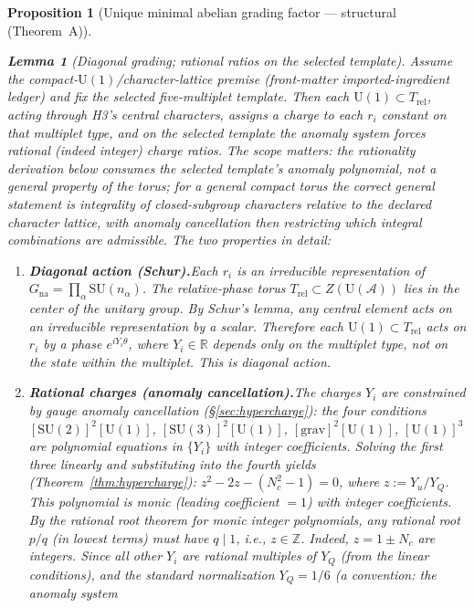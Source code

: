 \documentclass[11pt]{article}
\newtheorem{lemma}[theorem]{Lemma}
\newtheorem{proposition}[theorem]{Proposition}
\theoremstyle{definition}
\newcommand{\SU}{\mathrm{SU}}
\newcommand{\U}{\mathrm{U}}
\begin{document}
\begin{proposition}[Unique minimal abelian grading factor ---
structural (Theorem~A)]
\begin{lemma}[Diagonal grading; rational ratios on the selected template]
\label{lem:A3_derived}
Assume the compact-$\U(1)$/character-lattice premise (front-matter
imported-ingredient ledger) and fix the selected five-multiplet
template.  Then each $\U(1) \subset T_{\mathrm{rel}}$, acting through
H3's central characters, assigns a charge to each $r_i$ constant on
that multiplet type, and on the selected template the anomaly system
forces rational (indeed integer) charge ratios.  The scope matters:
the rationality derivation below consumes the selected template's
anomaly polynomial, not a general property of the torus; for a
general compact torus the correct general statement is integrality of
closed-subgroup characters relative to the declared character
lattice, with anomaly cancellation then restricting which integral
combinations are admissible.  The two properties in detail:
\begin{enumerate}[label=(\alph*),nosep]
  \item \textbf{Diagonal action (Schur).}\quad Each $r_i$ is an
  irreducible representation of $G_{\mathrm{na}} = \prod_\alpha
  \SU(n_\alpha)$.  The relative-phase torus
  $T_{\mathrm{rel}} \subset Z(\mathrm{U}(\mathcal{A}))$ lies in the
  center of the unitary group.  By Schur's lemma, any central element
  acts on an irreducible representation by a scalar.  Therefore each
  $\U(1) \subset T_{\mathrm{rel}}$ acts on $r_i$ by a phase
  $e^{i Y_i \theta}$, where $Y_i \in \mathbb{R}$ depends only on the
  multiplet type, not on the state within the multiplet.  This is
  diagonal action.
  \item \textbf{Rational charges (anomaly cancellation).}\quad The
  charges $Y_i$ are constrained by gauge anomaly cancellation
  (\S\ref{sec:hypercharge}): the four conditions
  $[\SU(2)]^2[\U(1)]$, $[\SU(3)]^2[\U(1)]$,
  $[\mathrm{grav}]^2[\U(1)]$, $[\U(1)]^3$ are polynomial equations
  in $\{Y_i\}$ with integer coefficients.  Solving the first three
  linearly and substituting into the fourth yields
  (Theorem~\ref{thm:hypercharge}):
  $z^2 - 2z - (N_c^2 - 1) = 0$, where $z := Y_u / Y_Q$.
  This polynomial is \emph{monic} (leading coefficient $= 1$) with
  integer coefficients.  By the rational root theorem for monic
  integer polynomials, any rational root $p/q$ (in lowest terms)
  must have $q \mid 1$, i.e., $z \in \mathbb{Z}$.  Indeed,
  $z = 1 \pm N_c$ are integers.  Since all other $Y_i$ are rational
  multiples of $Y_Q$ (from the linear conditions), and the standard
  normalization $Y_Q = 1/6$ (a \emph{convention}: the anomaly system

\end{enumerate}
\end{lemma}
\end{proposition}
\end{document}
